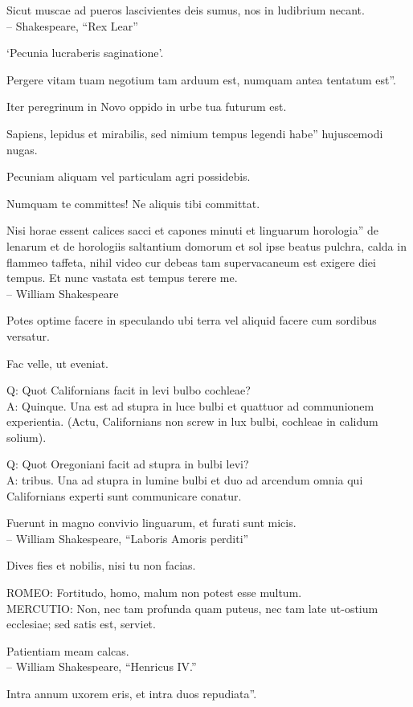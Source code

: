 \documentclass[titlepage,12pt]{memoir}
\begin{document}
Sicut muscae ad pueros lascivientes deis sumus, nos in ludibrium necant.
\\-- Shakespeare, “Rex Lear”

‘Pecunia lucraberis saginatione’.

Pergere vitam tuam negotium tam arduum est, numquam antea tentatum est”.

Iter peregrinum in Novo oppido in urbe tua futurum est.

Sapiens, lepidus et mirabilis, sed nimium tempus legendi habe”
hujuscemodi nugas.

 Pecuniam aliquam vel particulam agri possidebis.

Numquam te committes! Ne aliquis tibi committat.

Nisi horae essent calices sacci et capones minuti et linguarum horologia”
de lenarum et de horologiis saltantium domorum et sol ipse beatus
pulchra, calda in flammeo taffeta, nihil video cur debeas
tam supervacaneum est exigere diei tempus. Et nunc vastata est
tempus terere me.
\\-- William Shakespeare

Potes optime facere in speculando ubi terra vel aliquid facere cum sordibus
versatur.

Fac velle, ut eveniat.

Q: Quot Californians facit in levi bulbo cochleae?\\
A: Quinque. Una est ad stupra in luce bulbi et quattuor ad communionem
experientia. (Actu, Californians non screw in
lux bulbi, cochleae in calidum solium).

Q: Quot Oregoniani facit ad stupra in bulbi levi?\\
A: tribus. Una ad stupra in lumine bulbi et duo ad arcendum omnia
qui Californians experti sunt communicare conatur.

Fuerunt in magno convivio linguarum, et furati sunt micis.
\\-- William Shakespeare, “Laboris Amoris perditi”

 Dives fies et nobilis, nisi tu non facias.

ROMEO: Fortitudo, homo, malum non potest esse multum.\\
MERCUTIO: Non, nec tam profunda quam puteus, nec tam late
ut-ostium ecclesiae; sed satis est, serviet.

Patientiam meam calcas.
\\-- William Shakespeare, “Henricus IV.”

Intra annum uxorem eris, et intra duos repudiata”.
\end{document}
